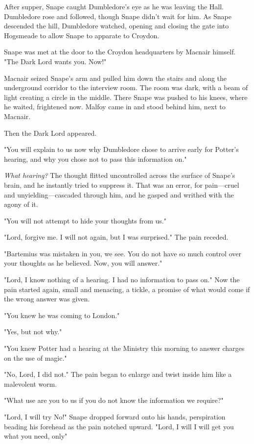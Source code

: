 After supper, Snape caught Dumbledore's eye as he was leaving the Hall. Dumbledore rose and followed, though Snape didn't wait for him. As Snape descended the hill, Dumbledore watched, opening and closing the gate into Hogsmeade to allow Snape to apparate to Croydon.

Snape was met at the door to the Croydon headquarters by Macnair himself. "The Dark Lord wants you. Now!"

Macnair seized Snape's arm and pulled him down the stairs and along the underground corridor to the interview room. The room was dark, with a beam of light creating a circle in the middle. There Snape was pushed to his knees, where he waited, frightened now. Malfoy came in and stood behind him, next to Macnair.

Then the Dark Lord appeared.

"You will explain to us now why Dumbledore chose to arrive early for Potter's hearing, and why you chose not to pass this information on."

\emph{What hearing?} The thought flitted uncontrolled across the surface of Snape's brain, and he instantly tried to suppress it. That was an error, for pain—cruel and unyielding—cascaded through him, and he gasped and writhed with the agony of it.

"You will not attempt to hide your thoughts from us."

"Lord, forgive me. I will not again, but I was surprised." The pain receded.

"Bartemius was mistaken in you, we see. You do not have so much control over your thoughts as he believed. Now, you will answer."

"Lord, I know nothing of a hearing. I had no information to pass on." Now the pain started again, small and menacing, a tickle, a promise of what would come if the wrong answer was given.

"You knew he was coming to London."

"Yes, but not why."

"You knew Potter had a hearing at the Ministry this morning to answer charges on the use of magic."

"No, Lord, I did not." The pain began to enlarge and twist inside him like a malevolent worm.

"What use are you to us if you do not know the information we require?"

"Lord, I will try{\el} No!" Snape dropped forward onto his hands, perspiration beading his forehead as the pain notched upward. "Lord, I will{\el} I will get you what you need, only{\el}"


